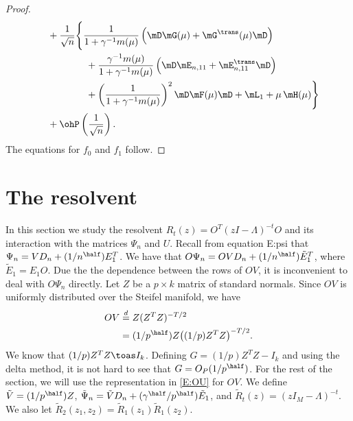 \begin{proof}
\[\begin{split}
                &\quad+
                \frac{1}{\sqrt{n}} \Bigg\{
                    \frac{1}{1 + \gamma^{-1} m(\mu)}
                        \left( \mD \mG(\mu) + \mG^\trans(\mu) \mD \right) \\
                    &\quad\qquad\qquad+
                    \frac{\gamma^{-1} m(\mu)}{1 + \gamma^{-1} m(\mu)}
                    \left( \mD \mE_{n,11} + \mE_{n,11}^\trans \mD \right) \\
                    &\quad\qquad\qquad+
                    \left(
                        \frac{1}{1 + \gamma^{-1} m(\mu)}
                    \right)^2
                    \mD \mF(\mu) \mD
                    +
                    \mL_1
                    +
                    \mu \, \mH( \mu ) \Bigg\} \\
                &\quad+
                \ohP\left( \frac{1}{\sqrt{n}} \right).
        \end{split}
    \]
    The equations for $f_0$ and $f_1$ follow.
\end{proof}

\clearpage




\section{The resolvent}\label{S:resolvent}

In this section we study the resolvent $R_t(z) = O^T (z I - \Lambda)^{-t} O$ 
and its interaction with the matrices $\Psi_n$ and $U$.  Recall from equation
{E:psi} that $\Psi_n = V D_n + (1/n^{\half}) E_1^T$.  We have that
$O \Psi_n = O V D_n + (1/n^{\half}) \tilde E_1^T$, where $\tilde E_1 = E_1 O$.
Due the the dependence between the rows of $O V$, it is inconvenient to
deal with $O \Psi_n$ directly.  Let $Z$ be a $p \times k$ matrix of \iid standard normals.  Since $O V$ is uniformly distributed over the Steifel manifold, we have
\begin{align}\label{E:OU}
    O V
        &\overset{d}{=} Z (Z^T Z)^{-T/2}  \notag \\
        &= (1/p^\half) Z \big((1/p) Z^T Z\big)^{-T/2}.  
\end{align}    
We know that
$(1/p) Z^T Z \toas I_k$.  Defining $G = (1/p) Z^T Z - I_k$ and using the
delta method, it is not hard to see that $G = O_P(1/p^\half)$.  For the rest
of the section, we will use the representation in \eqref{E:OU} for $OV$.  We
define $\tilde V = (1/p^\half) Z$,
$\tilde \Psi_n =  \tilde V D_n + (\gamma^{\half} / p^\half) \tilde E_1$,
and $\tilde R_t (z) = (z I_M - \Lambda)^{-t}$.  We also let 
$\tilde R_2(z_1, z_2) = \tilde R_1 (z_1) \tilde R_1 (z_2)$.


